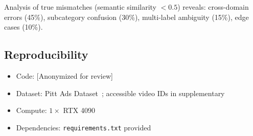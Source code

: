 \documentclass[sigconf,nonacm]{acmart}
\begin{document}
Analysis of true mismatches (semantic similarity $< 0.5$) reveals: cross-domain errors (45\%), subcategory confusion (30\%), multi-label ambiguity (15\%), edge cases (10\%).

\subsection{Reproducibility}

\begin{itemize}
    \item Code: [Anonymized for review]
    \item Dataset: Pitt Ads Dataset~\cite{hussain2017automatic}; accessible video IDs in supplementary
    \item Compute: $1\times$ RTX 4090
    \item Dependencies: \texttt{requirements.txt} provided
\end{itemize}
\end{document}

